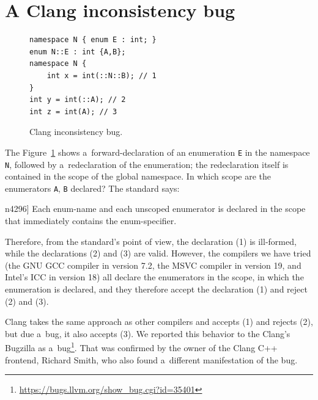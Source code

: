 \documentclass[nolot,nolof,nocover,printed]{fithesis3}
\newcommand{\stdN}[2]{\cite[#2]{#1}\xspace}
\begin{document}
\section{A Clang inconsistency bug}


\begin{figure}
\begin{lstlisting}
namespace N { enum E : int; }
enum N::E : int {A,B};
namespace N {
    int x = int(::N::B); // 1
}
int y = int(::A); // 2
int z = int(A); // 3
\end{lstlisting}
\caption{Clang inconsistency bug.}
\label{fig:clangInconsistencyBug}
\end{figure}

The Figure~\ref{fig:clangInconsistencyBug} shows a~forward-declaration of an enumeration \lstinline|E| in the namespace \lstinline|N|, followed by a~redeclaration of the enumeration; the redeclaration itself is contained in the scope of the global namespace. In which scope are the enumerators \lstinline|A|, \lstinline|B| declared? The standard says:
\begin{displayquote}[\stdN{n4296}{\S 7.2/11}]
Each enum-name and each unscoped enumerator is declared in the scope that immediately contains the
enum-specifier.
\end{displayquote}
Therefore, from the standard's point of view, the declaration (1) is ill-formed, while the declarations (2) and (3) are valid. However, the compilers we have tried (the GNU GCC compiler in version 7.2, the MSVC compiler in version 19, and Intel's ICC in version 18) all declare the enumerators in the scope, in which the enumeration is declared, and they therefore accept the declaration (1) and reject (2) and (3).

Clang takes the same approach as other compilers and accepts (1) and rejects (2), but due a~bug, it also accepts (3). We reported this behavior to the Clang's Bugzilla as a~bug\footnote{\url{https://bugs.llvm.org/show_bug.cgi?id=35401}}. That was confirmed by the owner of the Clang C++ frontend, Richard Smith, who also found a~different manifestation of the bug.
\end{document}
